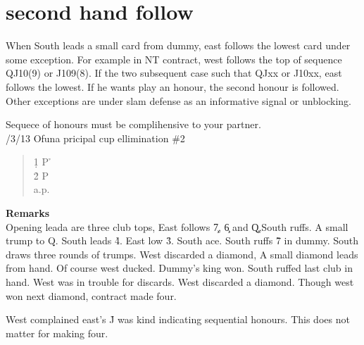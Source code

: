 \section{second hand follow}

When South leads a small card from dummy, east follows the 
lowest card under some exception. For example in NT contract,
west follows the top of sequence QJ10(9) or J109(8). If the
two subsequent case such that QJxx or J10xx, east follows the
lowest. If he wants play an honour, the second honour is 
followed. Other exceptions are under slam defense as an informative
signal or unblocking.



\vspace{0.5cm}

Sequece of honours must be complihensive to your partner.\\

/3/13 Ofuna pricipal cup ellimination  \#2
\begin{quote}
%
  {}%
  {}
  {}%
  {}%
\end{quote}
\begin{quote}
\begin{bidding}
1\d  \> P  \h  {}\s \\
2\h {}\s \> P \s \\
a.p.
\end{bidding}
\end{quote}

{\bf Remarks}\\

Opening leada are three club tops, East follows
\c 7, \c 6 and \c Q,South ruffs. A small trump to \s Q.
South leads \h 4.  East low \h 3. South ace. South ruffs 
\h 7 in dummy. South draws three rounds of trumps.
West discarded a diamond, A small diamond leads from hand.
Of course west ducked. Dummy's king won. South ruffed last club in hand.
West was in trouble for discards. West discarded a diamond. Though west won next diamond, contract made four.

West complained east's \h J was kind indicating 
sequential honours. This does not matter for making four.


